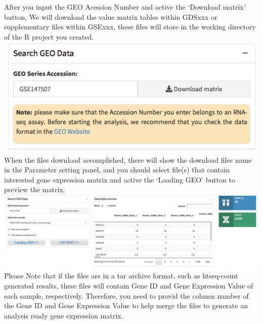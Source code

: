 \documentclass[
  a4paper,
  oneside]{book}
\begin{document}
After you input the GEO Acession Number and active the `Download matrix' button, We will download the value matrix tables within GDSxxx or supplementary files within GSExxx, these files will store in the working directory of the R project you created.\\
\includegraphics{images/search_geo_dataset.jpeg}\\

When the files download accomplished, there will show the download files name in the Parameter setting panel, and you should select file(s) that contain interested gene expression matrix and active the `Loading GEO' button to preview the matrix.\\
\includegraphics{images/geo_preview_single.jpeg}\\
Please Note that if the files are in a tar archive format, such as htseq-count generated results, these files will contain Gene ID and Gene Expression Value of each sample, respectively. Therefore, you need to provid the column number of the Gene ID and Gene Expression Value to help merge the files to generate an analysis ready gene expression matrix.
\end{document}
